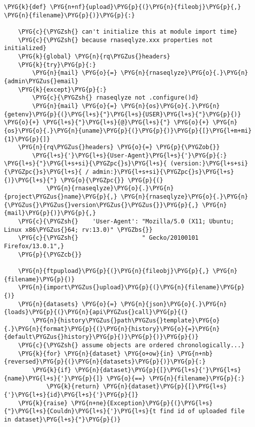 \begin{Verbatim}[commandchars=\\\{\}]
\PYG{k}{def} \PYG{n+nf}{upload}\PYG{p}{(}\PYG{n}{fileobj}\PYG{p}{,} \PYG{n}{filename}\PYG{p}{)}\PYG{p}{:}

    \PYG{c}{\PYGZsh{} can't initialize this at module import time}
    \PYG{c}{\PYGZsh{} because rnaseqlyze.xxx properties not initialized}
    \PYG{k}{global} \PYG{n}{rq\PYGZus{}headers}
    \PYG{k}{try}\PYG{p}{:}
        \PYG{n}{mail} \PYG{o}{=} \PYG{n}{rnaseqlyze}\PYG{o}{.}\PYG{n}{admin\PYGZus{}email}
    \PYG{k}{except}\PYG{p}{:}
        \PYG{c}{\PYGZsh{} rnaseqlyze not .configure()d}
        \PYG{n}{mail} \PYG{o}{=} \PYG{n}{os}\PYG{o}{.}\PYG{n}{getenv}\PYG{p}{(}\PYG{l+s}{"}\PYG{l+s}{USER}\PYG{l+s}{"}\PYG{p}{)} \PYG{o}{+} \PYG{l+s}{"}\PYG{l+s}{@}\PYG{l+s}{"} \PYG{o}{+} \PYG{n}{os}\PYG{o}{.}\PYG{n}{uname}\PYG{p}{(}\PYG{p}{)}\PYG{p}{[}\PYG{l+m+mi}{1}\PYG{p}{]}
    \PYG{n}{rq\PYGZus{}headers} \PYG{o}{=} \PYG{p}{\PYGZob{}}
        \PYG{l+s}{'}\PYG{l+s}{User-Agent}\PYG{l+s}{'}\PYG{p}{:} \PYG{l+s}{"}\PYG{l+s+si}{\PYGZpc{}s}\PYG{l+s}{ (version:}\PYG{l+s+si}{\PYGZpc{}s}\PYG{l+s}{ / admin:}\PYG{l+s+si}{\PYGZpc{}s}\PYG{l+s}{)}\PYG{l+s}{"} \PYG{o}{\PYGZpc{}} \PYG{p}{(}
            \PYG{n}{rnaseqlyze}\PYG{o}{.}\PYG{n}{project\PYGZus{}name}\PYG{p}{,} \PYG{n}{rnaseqlyze}\PYG{o}{.}\PYG{n}{\PYGZus{}\PYGZus{}version\PYGZus{}\PYGZus{}}\PYG{p}{,} \PYG{n}{mail}\PYG{p}{)}\PYG{p}{,}
    \PYG{c}{\PYGZsh{}    'User-Agent': "Mozilla/5.0 (X11; Ubuntu; Linux x86\PYGZus{}64; rv:13.0)" \PYGZbs{}}
    \PYG{c}{\PYGZsh{}                  " Gecko/20100101 Firefox/13.0.1",}
    \PYG{p}{\PYGZcb{}}

    \PYG{n}{ftpupload}\PYG{p}{(}\PYG{n}{fileobj}\PYG{p}{,} \PYG{n}{filename}\PYG{p}{)}
    \PYG{n}{import\PYGZus{}upload}\PYG{p}{(}\PYG{n}{filename}\PYG{p}{)}
    \PYG{n}{datasets} \PYG{o}{=} \PYG{n}{json}\PYG{o}{.}\PYG{n}{loads}\PYG{p}{(}\PYG{n}{api\PYGZus{}call}\PYG{p}{(}
        \PYG{n}{history\PYGZus{}path\PYGZus{}template}\PYG{o}{.}\PYG{n}{format}\PYG{p}{(}\PYG{n}{history}\PYG{o}{=}\PYG{n}{default\PYGZus{}history}\PYG{p}{)}\PYG{p}{)}\PYG{p}{)}
    \PYG{c}{\PYGZsh{} assume objects are ordered chronologically...}
    \PYG{k}{for} \PYG{n}{dataset} \PYG{o+ow}{in} \PYG{n+nb}{reversed}\PYG{p}{(}\PYG{n}{datasets}\PYG{p}{)}\PYG{p}{:}
        \PYG{k}{if} \PYG{n}{dataset}\PYG{p}{[}\PYG{l+s}{'}\PYG{l+s}{name}\PYG{l+s}{'}\PYG{p}{]} \PYG{o}{==} \PYG{n}{filename}\PYG{p}{:}
            \PYG{k}{return} \PYG{n}{dataset}\PYG{p}{[}\PYG{l+s}{'}\PYG{l+s}{id}\PYG{l+s}{'}\PYG{p}{]}
    \PYG{k}{raise} \PYG{n+ne}{Exception}\PYG{p}{(}\PYG{l+s}{"}\PYG{l+s}{Couldn}\PYG{l+s}{'}\PYG{l+s}{t find id of uploaded file in dataset}\PYG{l+s}{"}\PYG{p}{)}
\end{Verbatim}


